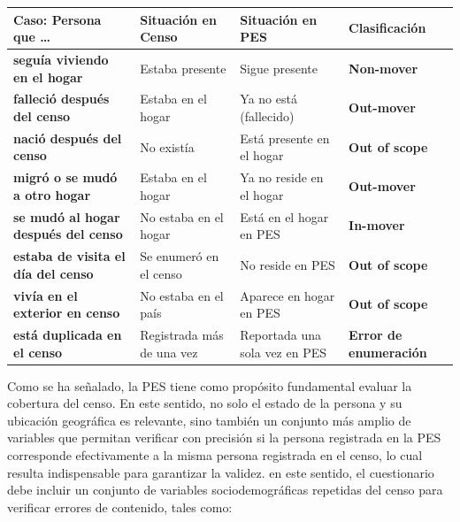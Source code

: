 \documentclass[
  12pt,
]{book}
\begin{document}
\begin{longtable}[]{@{}
  >{\raggedright\arraybackslash}p{}
  >{\raggedright\arraybackslash}p{}
  >{\raggedright\arraybackslash}p{}
  >{\raggedright\arraybackslash}p{}@{}}
\toprule\noalign{}
\begin{minipage}[b]{\linewidth}\raggedright
Caso: Persona que \ldots{}
\end{minipage} & \begin{minipage}[b]{\linewidth}\raggedright
Situación en Censo
\end{minipage} & \begin{minipage}[b]{\linewidth}\raggedright
Situación en PES
\end{minipage} & \begin{minipage}[b]{\linewidth}\raggedright
Clasificación
\end{minipage} \\
\midrule\noalign{}
\endhead
\bottomrule\noalign{}
\endlastfoot
\textbf{seguía viviendo en el hogar} & Estaba presente & Sigue presente & \textbf{Non-mover} \\
\textbf{falleció después del censo} & Estaba en el hogar & Ya no está (fallecido) & \textbf{Out-mover} \\
\textbf{nació después del censo} & No existía & Está presente en el hogar & \textbf{Out of scope} \\
\textbf{migró o se mudó a otro hogar} & Estaba en el hogar & Ya no reside en el hogar & \textbf{Out-mover} \\
\textbf{se mudó al hogar después del censo} & No estaba en el hogar & Está en el hogar en PES & \textbf{In-mover} \\
\textbf{estaba de visita el día del censo} & Se enumeró en el censo & No reside en PES & \textbf{Out of scope} \\
\textbf{vivía en el exterior en censo} & No estaba en el país & Aparece en hogar en PES & \textbf{Out of scope} \\
\textbf{está duplicada en el censo} & Registrada más de una vez & Reportada una sola vez en PES & \textbf{Error de enumeración} \\
\end{longtable}

Como se ha señalado, la PES tiene como propósito fundamental evaluar la cobertura del censo. En este sentido, no solo el estado de la persona y su ubicación geográfica es relevante, sino también un conjunto más amplio de variables que permitan verificar con precisión si la persona registrada en la PES corresponde efectivamente a la misma persona registrada en el censo, lo cual resulta indispensable para garantizar la validez. en este sentido, el cuestionario debe incluir un conjunto de variables sociodemográficas repetidas del censo para verificar errores de contenido, tales como:
\end{document}
